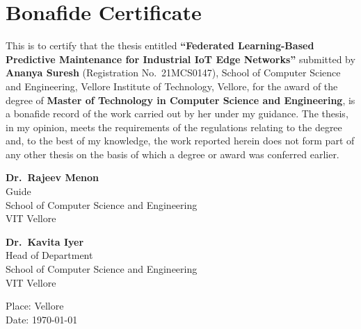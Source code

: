 \chapter*{Bonafide Certificate}
\thispagestyle{plain}

\vspace{4pt}
This is to certify that the thesis entitled \textbf{``Federated Learning-Based Predictive
Maintenance for Industrial IoT Edge Networks''} submitted by \textbf{Ananya Suresh}
(Registration No.\ 21MCS0147), School of Computer Science and Engineering, Vellore
Institute of Technology, Vellore, for the award of the degree of \textbf{Master of
Technology in Computer Science and Engineering}, is a bonafide record of the work carried
out by her under my guidance. The thesis, in my opinion, meets the requirements of the
regulations relating to the degree and, to the best of my knowledge, the work reported
herein does not form part of any other thesis on the basis of which a degree or award was
conferred earlier.

\vspace{0.5in}
\noindent
\begin{minipage}[t]{0.47\textwidth}
\textbf{Dr.\ Rajeev Menon}\\
Guide\\
School of Computer Science and Engineering\\
VIT Vellore
\end{minipage}\hfill
\begin{minipage}[t]{0.47\textwidth}
\textbf{Dr.\ Kavita Iyer}\\
Head of Department\\
School of Computer Science and Engineering\\
VIT Vellore
\end{minipage}
\par

\vspace{0.4in}
\noindent Place: Vellore\\
Date: \today

